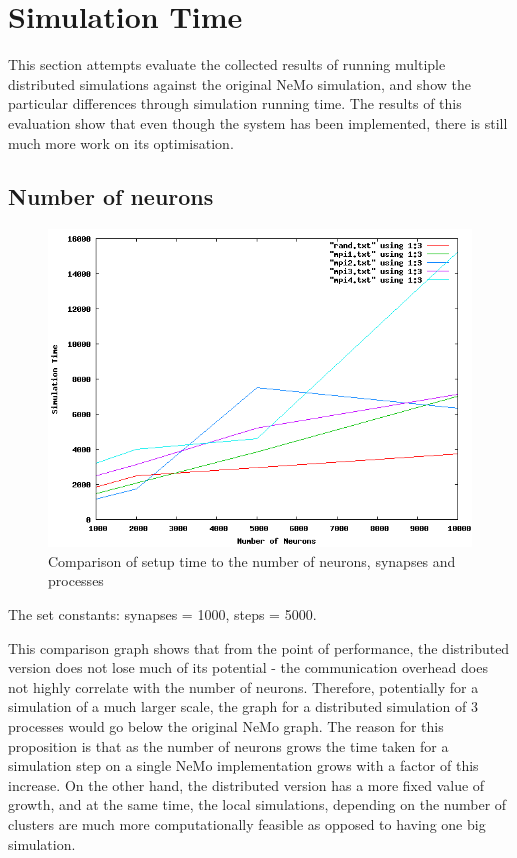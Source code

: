 \section{Simulation Time}

This section attempts evaluate the collected results of running multiple distributed simulations against the original NeMo simulation, and show the particular differences through simulation running time. The results of this evaluation show that even though the system has been implemented, there is still much more work on its optimisation.

\subsection{Number of neurons}

\begin{figure}[h!]
\begin{center}
\includegraphics[scale = 0.4]{images/distributed_neurons.png}
\end{center}
\caption{Comparison of setup time to the number of neurons, synapses and processes}
\end{figure}

The set constants: synapses = 1000, steps = 5000.

This comparison graph shows that from the point of performance, the distributed version does not lose much of its potential - the communication overhead does not highly correlate with the number of neurons. Therefore, potentially for a simulation of a much larger scale, the graph for a distributed simulation of 3 processes would go below the original NeMo graph. The reason for this proposition is that as the number of neurons grows the time taken for a simulation step on a single NeMo implementation grows with a factor of this increase. On the other hand, the distributed version has a more fixed value of growth, and at the same time, the local simulations, depending on the number of clusters are much more computationally feasible as opposed to having one big simulation.

